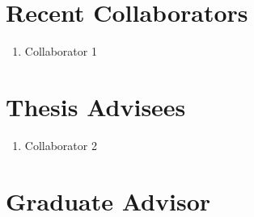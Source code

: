 \documentclass{article}
\newenvironment{denseenumerate}%
	{\begin{enumerate}\setlength{\itemsep}{0pt}\setlength{\parsep}{0pt}}%
	{\end{enumerate}}
\begin{document}
\section*{Recent Collaborators}
\begin{denseenumerate}
\item Collaborator 1
\end{denseenumerate}

\section*{Thesis Advisees}
\begin{denseenumerate}
\item Collaborator 2
\end{denseenumerate}

\section*{Graduate Advisor}


%
\end{document}
